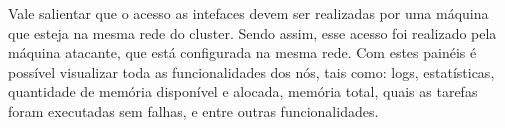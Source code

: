 Vale salientar que o acesso as intefaces devem ser realizadas por uma máquina que esteja na mesma rede do cluster. Sendo assim, esse acesso foi realizado pela máquina atacante, que está configurada na mesma rede. Com estes painéis é possível visualizar toda as funcionalidades dos nós, tais como: logs, estatísticas, quantidade de memória disponível e alocada, memória total, quais as tarefas foram executadas sem falhas, e entre outras funcionalidades.
